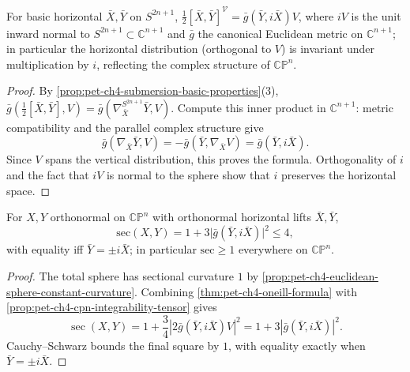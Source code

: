 \begin{proposition}
  \label{prop:pet-ch4-cpn-integrability-tensor}
  For basic horizontal $\bar X,\bar Y$ on $S^{2n+1}$, $\tfrac12[\bar X,\bar Y]^{\mathcal V}=\bar g(\bar Y,i\bar X)V$,
  where $iV$ is the unit inward normal to $S^{2n+1}\subset\mathbb{C}^{n+1}$ and
  $\bar g$ the canonical Euclidean metric on $\mathbb{C}^{n+1}$; in particular the
  horizontal distribution (orthogonal to $V$) is invariant under
  multiplication by $i$, reflecting the complex structure of $\mathbb{CP}^n$.
\end{proposition}
\begin{proof}
  \sketch
  By \cref{prop:pet-ch4-submersion-basic-properties}(3),
  $\bar g(\tfrac12[\bar X,\bar Y],V)
  =\bar g(\nabla^{S^{2n+1}}_{\bar X}\bar Y,V)$. Compute this inner product in
  $\mathbb C^{n+1}$: metric compatibility and the parallel complex structure
  give
  \[
    \bar g(\nabla_{\bar X}\bar Y,V)
    =-\bar g(\bar Y,\nabla_{\bar X}V)
    =\bar g(\bar Y,i\bar X).
  \]
  Since $V$ spans the vertical distribution, this proves the formula. Orthogonality
  of $i$ and the fact that $iV$ is normal to the sphere show that $i$ preserves
  the horizontal space.
\end{proof}


\begin{theorem}
  \label{thm:pet-ch4-cpn-sectional-curvature}
  For $X,Y$ orthonormal on $\mathbb{CP}^n$ with orthonormal horizontal lifts
  $\bar X,\bar Y$,
  \[
    \mathrm{sec}(X,Y)=1+3\big|\bar g(\bar Y,i\bar X)\big|^2\le4,
  \]
  with equality iff $\bar Y=\pm i\bar X$; in particular $\mathrm{sec}\ge1$
  everywhere on $\mathbb{CP}^n$.
\end{theorem}
\begin{proof}
  \sketch
  The total sphere has sectional curvature $1$ by
  \cref{prop:pet-ch4-euclidean-sphere-constant-curvature}. Combining
  \cref{thm:pet-ch4-oneill-formula} with
  \cref{prop:pet-ch4-cpn-integrability-tensor} gives
  \[
    \operatorname{sec}(X,Y)
    =1+\frac34\left|2\bar g(\bar Y,i\bar X)V\right|^2
    =1+3|\bar g(\bar Y,i\bar X)|^2.
  \]
  Cauchy--Schwarz bounds the final square by $1$, with equality exactly when
  $\bar Y=\pm i\bar X$.
\end{proof}

